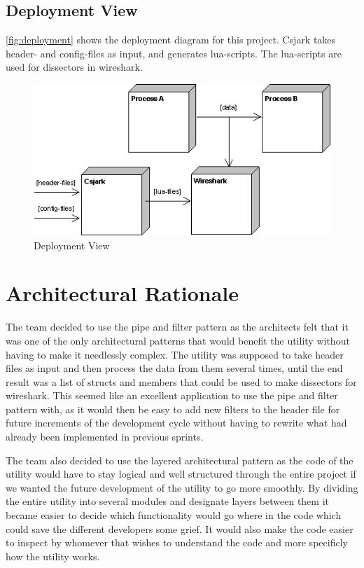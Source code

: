 \subsection{Deployment View}
\autoref{fig:deployment} shows the deployment diagram for this project. Csjark takes \gls{header}- and config-files as input, and generates \Gls{lua}-\glspl{script}. The \Gls{lua}-\glspl{script} are used for \glspl{dissector} in \Gls{wireshark}.

\begin{figure}[htb]
	\includegraphics[width = \textwidth]{./planning/img/Deployment}
	\caption{Deployment View\label{fig:deployment}}
\end{figure}

\section{Architectural Rationale}
The team decided to use the pipe and filter pattern as the architects felt that it was one of the only architectural patterns that would benefit the \gls{utility} without having to make it needlessly complex. The \gls{utility} was supposed to take \gls{header} files as input and then process the data from them several times, until the end result was a list of \glspl{struct} and \glspl{member} that could be used to make \glspl{dissector} for \Gls{wireshark}. This seemed like an excellent application to use the pipe and filter pattern with, as it would then be easy to add new filters to the \gls{header} file for future increments of the development cycle without having to rewrite what had already been implemented in previous sprints.

The team also decided to use the layered architectural pattern as the code of the utility would have to stay logical and well structured through the entire project if we wanted the future development of the utility to go more smoothly. By dividing the entire utility into several modules and designate layers between them it became easier to decide which functionality would go where in the code which could save the different developers some grief. It would also make the code easier to inspect by whomever that wishes to understand the code and more specificly how the utility works.

